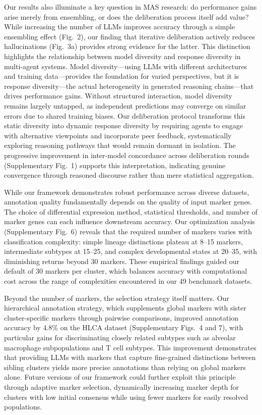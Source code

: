 \documentclass[pdflatex,sn-nature]{sn-jnl}%
\theoremstyle{thmstyleone}%
\theoremstyle{thmstyletwo}%
\theoremstyle{thmstylethree}%
\begin{document}
Our results also illuminate a key question in MAS research: do performance gains arise merely from ensembling, or does the deliberation process itself add value? While increasing the number of LLMs improves accuracy through a simple ensembling effect (Fig.~2), our finding that iterative deliberation actively reduces hallucinations (Fig.~3a) provides strong evidence for the latter. This distinction highlights the relationship between model diversity and response diversity in multi-agent systems\cite{tran2025multi}. Model diversity---using LLMs with different architectures and training data---provides the foundation for varied perspectives, but it is response diversity---the actual heterogeneity in generated reasoning chains---that drives performance gains. Without structured interaction, model diversity remains largely untapped, as independent predictions may converge on similar errors due to shared training biases. Our deliberation protocol transforms this static diversity into dynamic response diversity by requiring agents to engage with alternative viewpoints and incorporate peer feedback, systematically exploring reasoning pathways that would remain dormant in isolation. The progressive improvement in inter-model concordance across deliberation rounds (Supplementary Fig.~1) supports this interpretation, indicating genuine convergence through reasoned discourse rather than mere statistical aggregation.

While our framework demonstrates robust performance across diverse datasets, annotation quality fundamentally depends on the quality of input marker genes. The choice of differential expression method, statistical thresholds, and number of marker genes can each influence downstream accuracy. Our optimization analysis (Supplementary Fig.~6) reveals that the required number of markers varies with classification complexity: simple lineage distinctions plateau at 8--15 markers, intermediate subtypes at 15--25, and complex developmental states at 20--35, with diminishing returns beyond 30 markers. These empirical findings guided our default of 30 markers per cluster, which balances accuracy with computational cost across the range of complexities encountered in our 49 benchmark datasets.

Beyond the number of markers, the selection strategy itself matters. Our hierarchical annotation strategy, which supplements global markers with sister cluster-specific markers through pairwise comparisons, improved annotation accuracy by 4.8\% on the HLCA dataset (Supplementary Figs.~4 and 7), with particular gains for discriminating closely related subtypes such as alveolar macrophage subpopulations and T cell subtypes. This improvement demonstrates that providing LLMs with markers that capture fine-grained distinctions between sibling clusters yields more precise annotations than relying on global markers alone. Future versions of our framework could further exploit this principle through adaptive marker selection, dynamically increasing marker depth for clusters with low initial consensus while using fewer markers for easily resolved populations.
\end{document}
